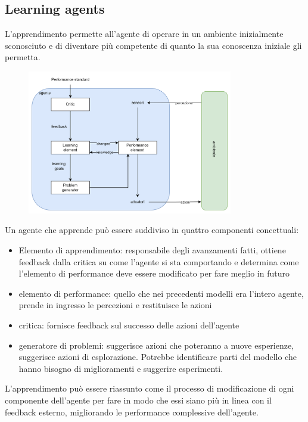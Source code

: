 \subsection{\foreignlanguage{english}{Learning agents}}

L'apprendimento permette all'agente di operare in un ambiente inizialmente sconosciuto e di diventare più competente di quanto la sua conoscenza iniziale gli permetta.

\begin{figure}[H]
	\centering
	\includegraphics[width=0.8\textwidth]{capitoli/agenti-intelligenti/imgs/learning.png}
\end{figure}

Un agente che apprende può essere suddiviso in quattro componenti concettuali:

\begin{itemize}
	\item Elemento di apprendimento: responsabile degli avanzamenti fatti, ottiene feedback dalla critica su come l'agente si sta comportando e determina come l'elemento di performance deve essere modificato per fare meglio in futuro
	\item elemento di performance: quello che nei precedenti modelli era l'intero agente, prende in ingresso le percezioni e restituisce le azioni
	\item critica: fornisce feedback sul successo delle azioni dell'agente
	\item generatore di problemi: suggerisce azioni che poteranno a nuove esperienze, suggerisce azioni di esplorazione. Potrebbe identificare parti del modello che hanno bisogno di miglioramenti e suggerire esperimenti.
\end{itemize}

L'apprendimento può essere riassunto come il processo di modificazione di ogni componente dell'agente per fare in modo che essi siano più in linea con il feedback esterno, migliorando le performance complessive dell'agente.

